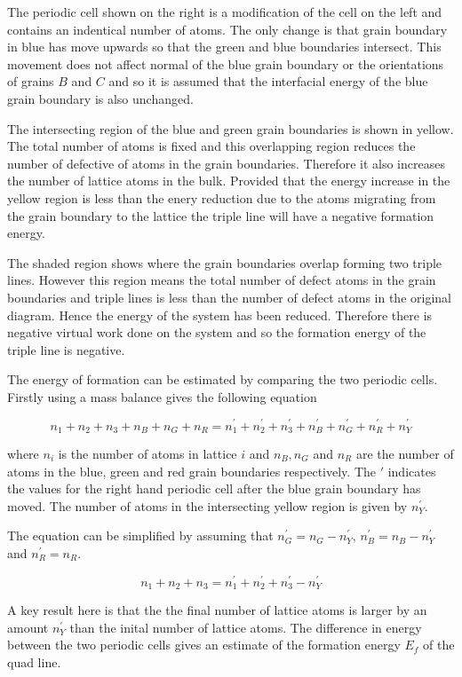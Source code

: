 \documentclass[12pt,a4paper]{book}
\begin{document}
The periodic cell shown on the right is a modification of the cell on the left and contains an indentical number of atoms. The only change is that grain boundary in blue has move upwards so that the green and blue boundaries intersect. This movement does not affect  normal of the blue grain boundary or the orientations of grains $B$ and $C$ and so it is assumed that the interfacial energy of the blue grain boundary is also unchanged.  

The intersecting region of the blue and green grain boundaries is shown in yellow. The total number of atoms is fixed and this overlapping region reduces the number of defective of atoms in the grain boundaries. Therefore it also increases the number of lattice atoms in the bulk. Provided that the energy increase in the yellow region is less than the enery reduction due to the atoms migrating from the grain boundary to the lattice the triple line will have a negative formation energy. 
 
The shaded region shows where the grain boundaries overlap forming two triple lines. However this region means the total number of defect atoms in the grain boundaries and triple lines is less than the number of defect atoms in the original diagram. Hence the energy of the system has been reduced. Therefore there is negative virtual work done on the system and so the formation energy of the triple line is negative. 

The energy of formation can be estimated by comparing the two periodic cells. Firstly using a mass balance gives the following
equation

\[ n_1 + n_2 + n_3 + n_B + n_G + n_R = n_1^{\prime} + n_2^{\prime} + n_3^{\prime} + n_B^{\prime} + n_G^{\prime} + n_R^{\prime} +
n_Y^{\prime} \]

where $n_i$ is the number of atoms in lattice $i$ and $n_B, n_G$ and $n_R$ are the number of atoms in the blue, green and red grain boundaries respectively. The $\prime$ indicates the values for the right hand periodic cell after the blue grain boundary has moved.  The number of atoms in the intersecting yellow region is given by $n_Y^{\prime}$.

The equation can be simplified by assuming that $n_G^{\prime} = n_G-n_Y^{\prime}$, $n_B^{\prime} = n_B-n_Y^{\prime}$ and $n_R^{\prime} = n_R$. 

\[ n_1 + n_2 + n_3   = n_1^{\prime} + n_2^{\prime} + n_3^{\prime}- n_Y^{\prime} \]

A key result here is that the the final number of lattice atoms is larger by an amount $n_Y^{\prime}$ than the inital number of lattice atoms. The difference in energy between the two periodic cells gives an estimate of the formation energy $E_f$ of the quad line.
\end{document}
